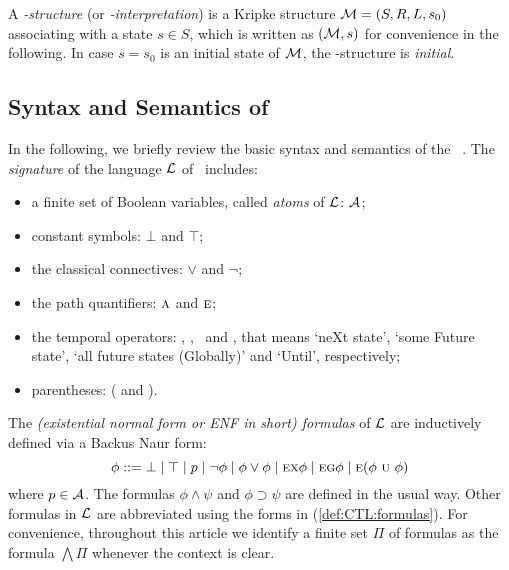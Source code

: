 \documentclass[letterpaper]{article}
\begin{document}
A {\em \MPK-structure} (or {\em \MPK-interpretation}) is a Kripke structure
${\cal M}=(S, R, L, s_0)$ associating
with a state $s\in S$, which is written as $({\cal M},s)$ for convenience in the following.
In case $s=s_0$ is an initial state of $\cal M$, the \MPK-structure is {\em initial}.



\subsection{Syntax and Semantics of \CTL}
In the following, we briefly review the basic syntax and semantics
of the \CTL~\cite{DBLP:journals/toplas/ClarkeES86}.
The {\em signature} of the language $\cal L$ of \CTL\ includes:
\begin{itemize}
  \item a finite set of Boolean variables, called {\em atoms} of $\cal L$: $\cal A$;
  \item constant symbols: $\bot$ and $\top$;
  \item the classical connectives: $\lor$ and $\neg$;
  \item the path quantifiers: $\textsc{a}$ and $\textsc{e}$;
  \item the temporal operators: \NEXT, \FUTURE, \GLOBAL\ and \UNTIL, that
  means `neXt state', `some Future state', `all future states (Globally)' and `Until', respectively;
  \item parentheses: ( and ).
\end{itemize}

The {\em (existential normal form or ENF in short) formulas} of
$\cal L$ are inductively defined via a Backus Naur form:
\begin{equation}\label{def:CTL:formulas}
  \phi ::=  \bot \mid \top \mid p \mid\neg\phi \mid \phi\lor\phi \mid
    \EXIST \NEXT \phi \mid
    \EXIST \GLOBAL \phi \mid
    \EXIST (\phi\ \UNTIL\ \phi)%
\end{equation}
where $p\in\cal A$. The formulas $\phi\land\psi$ and $\phi\supset \psi$
are defined in the usual way.
Other formulas in $\cal L$ are abbreviated
using the forms in (\ref{def:CTL:formulas}).
For convenience, throughout this article we identify a finite set $\Pi$ of formulas as the formula $\bigwedge\Pi$ whenever the context is clear.
\end{document}
